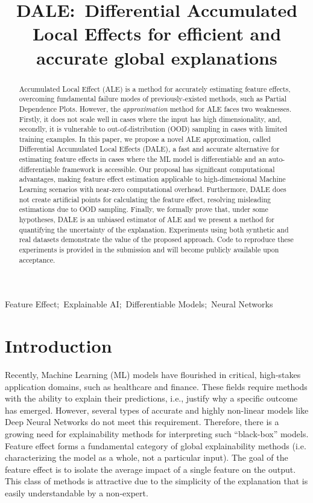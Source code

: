 \documentclass[wcp]{jmlr}
\title[DALE:~Differential Accumulated Local
Effects]{DALE:~Differential Accumulated Local Effects for efficient
and accurate global explanations}
\begin{document}
\maketitle

\begin{abstract}
  Accumulated Local Effect (ALE) is a method for accurately estimating feature effects, overcoming fundamental failure modes of previously-existed methods, such as Partial Dependence Plots. However, the \textit{approximation} method for ALE faces two weaknesses. Firstly, it does not scale well in cases where the input has high dimensionality, and, secondly, it is vulnerable to out-of-distribution (OOD) sampling in cases with limited training examples. In this paper, we propose a novel ALE approximation, called Differential Accumulated Local Effects (DALE), a fast and accurate alternative for estimating feature effects in cases where the ML model is differentiable and an auto-differentiable framework is accessible. Our proposal has significant computational advantages, making feature effect estimation applicable to high-dimensional Machine Learning scenarios with near-zero computational overhead. Furthermore, DALE does not create artificial points for calculating the feature effect, resolving misleading estimations due to OOD sampling. Finally, we formally prove that, under some hypotheses, DALE is an unbiased estimator of ALE and we present a method for quantifying the uncertainty of the explanation. Experiments using both synthetic and real datasets demonstrate the value of the proposed approach. Code to reproduce these experiments is provided in the submission and will become publicly available upon acceptance.
\end{abstract}
\begin{keywords}
Feature Effect;~Explainable AI;~Differentiable Models;~Neural Networks
\end{keywords}

\section{Introduction}
\label{sec:1-introduction}

Recently, Machine Learning (ML) models have flourished in critical, high-stakes application domains, such as healthcare and finance. These fields require methods with the ability to explain their predictions, i.e., justify why a specific outcome has emerged. However, several types of accurate and highly non-linear models like Deep Neural Networks do not meet this requirement. Therefore, there is a growing need for explainability methods for interpreting such ``black-box'' models. Feature effect forms a fundamental category of global explainability methods (i.e. characterizing the model as a whole, not a particular input). The goal of the feature effect is to isolate the average impact of a single feature on the output. This class of methods is attractive due to the simplicity of the explanation that is easily understandable by a non-expert.
\end{document}
